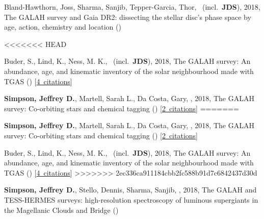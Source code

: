 \item[{\color{numcolor}\scriptsize4}] Bland-Hawthorn, Joss, Sharma, Sanjib, Tepper-Garcia, Thor, \etal\ (incl.\ \textbf{JDS}), 2018, The GALAH survey and Gaia DR2: dissecting the stellar disc's phase space by age, action, chemistry and location ()

<<<<<<< HEAD
\item[{\color{numcolor}\scriptsize3}] Buder, S., Lind, K., Ness, M. K., \etal\ (incl.\ \textbf{JDS}), 2018, The GALAH survey: An abundance, age, and kinematic inventory of the solar neighbourhood made with TGAS () [\href{https://ui.adsabs.harvard.edu/#abs/2018arXiv180405869B}{4~citations}]

\item[{\color{numcolor}\scriptsize2}] \textbf{Simpson, Jeffrey D.}, Martell, Sarah L., Da Costa, Gary, \etal, 2018, The GALAH survey: Co-orbiting stars and chemical tagging () [\href{https://ui.adsabs.harvard.edu/#abs/2018arXiv180405894S}{2~citations}]
=======
\item[{\color{numcolor}\scriptsize3}] \textbf{Simpson, Jeffrey D.}, Martell, Sarah L., Da Costa, Gary, \etal, 2018, The GALAH survey: Co-orbiting stars and chemical tagging () [\href{https://ui.adsabs.harvard.edu/#abs/2018arXiv180405894S}{2~citations}]

\item[{\color{numcolor}\scriptsize2}] Buder, S., Lind, K., Ness, M. K., \etal\ (incl.\ \textbf{JDS}), 2018, The GALAH survey: An abundance, age, and kinematic inventory of the solar neighbourhood made with TGAS () [\href{https://ui.adsabs.harvard.edu/#abs/2018arXiv180405869B}{4~citations}]
>>>>>>> 2ec336ca911184cbb2fc588b91d7c6842437d30d

\item[{\color{numcolor}\scriptsize1}] \textbf{Simpson, Jeffrey D.}, Stello, Dennis, Sharma, Sanjib, \etal, 2018, The GALAH and TESS-HERMES surveys: high-resolution spectroscopy of luminous supergiants in the Magellanic Clouds and Bridge ()